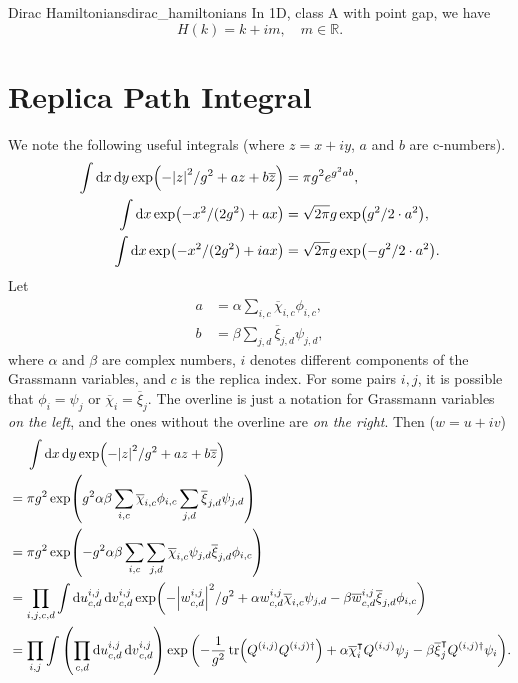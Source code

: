 \documentclass{article}
\begin{document}
\begin{example}{Dirac Hamiltonians}{dirac_hamiltonians}
    In 1D, class A with point gap, we have
    \[ H(k) = k + im,\quad m\in \mathbb{R}. \]
\end{example}

\section{Replica Path Integral}

We note the following useful integrals (where $z=x+iy$, $a$ and $b$ are c-numbers).
\begin{align*}
    \int \dd{x} \dd{y} \exp(-\abs{z}^2/g^2 + az + b\overline{z}) &= \pi g^2 e^{g^2 ab},\\
    \int \dd{x} \exp(-x^2/(2g^2) + ax) &= \sqrt{2\pi}g \exp(g^2/2\cdot a^2), \\
    \int \dd{x} \exp(-x^2/(2g^2) + iax) &= \sqrt{2\pi}g \exp(-g^2/2\cdot a^2).
\end{align*}
Let
\begin{align*}
    a &= \alpha \sum_{i,c}\overline{\chi}_{i,c} \phi_{i,c}, \\
    b &= \beta \sum_{j,d}\overline{\xi}_{j,d} \psi_{j,d},
\end{align*}
where $\alpha$ and $\beta$ are complex numbers, $i$ denotes different components of the Grassmann variables, and $c$ is the replica index.
For some pairs $i,j$, it is possible that $\phi_i = \psi_j$ or $\overline{\chi}_i = \overline{\xi}_j$.
The overline is just a notation for Grassmann variables \textit{on the left}, and the ones without the overline are \textit{on the right}.
Then ($w=u+iv$)
\begin{align*}
    &\phantom{{}={}} \int \dd{x} \dd{y} \exp(-\abs{z}^2/g^2 + az + b\overline{z}) \\
    &= \pi g^2 \exp(g^2 \alpha \beta \sum_{i,c}\overline{\chi}_{i,c} \phi_{i,c} \sum_{j,d}\overline{\xi}_{j,d} \psi_{j,d}) \\
    &= \pi g^2 \exp(-g^2 \alpha \beta \sum_{i,c}\sum_{j,d} \overline{\chi}_{i,c}\psi_{j,d} \overline{\xi}_{j,d} \phi_{i,c} ) \\
    &= \prod_{i,j,c,d} \int \dd{u}^{i,j}_{c,d} \dd{v}^{i,j}_{c,d} \exp(-\abs{w^{i,j}_{c,d}}^2/g^2 + \alpha w^{i,j}_{c,d} \overline{\chi}_{i,c}\psi_{j,d} - \beta \overline{w}^{i,j}_{c,d} \overline{\xi}_{j,d} \phi_{i,c}) \\
    &= \prod_{i,j} \int \qty(\prod_{c,d} \dd{u}^{i,j}_{c,d} \dd{v}^{i,j}_{c,d}) \exp\qty(-\frac{1}{g^2} \tr(Q^{(i,j)} Q^{(i,j)\dagger}) + \alpha \overline{\chi}^\intercal_i Q^{(i,j)} \psi_j - \beta \overline{\xi}^\intercal_{j} Q^{(i,j)\dagger} \psi_i).
\end{align*}
\end{document}
